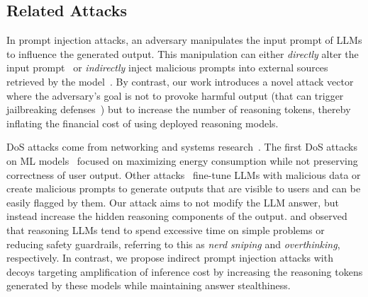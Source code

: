 \subsection{Related Attacks}

 In prompt injection attacks, an adversary manipulates the input prompt of LLMs to influence the generated output. This manipulation can either \emph{directly} alter the input prompt~\citep{perez2022ignore, apruzzese2023real} or \emph{indirectly} inject malicious prompts into external sources retrieved by the model~\citep{greshake2023not}. By contrast, our work introduces a novel attack vector where the adversary's goal is not to provoke harmful output (that can trigger jailbreaking defenses~\cite{anthropic2025, zaremba2025trading}) but to increase the number of reasoning tokens, thereby inflating the financial cost of using deployed reasoning models.



 DoS attacks come from networking and systems research~\citep{bellardo2003802, heftrig2024harder,martin2004denial}. The first DoS attacks on ML models~\citep{shumailov2021sponge} focused on maximizing energy consumption while not preserving correctness of user output. Other attacks~\citep{gao2024denial,chen2022nicgslowdown, gao2024inducing, geiping2024coercing} fine-tune LLMs with malicious data or create malicious prompts to generate outputs that are visible to users and can be easily flagged by them. Our attack aims to not modify the LLM answer,  but instead increase the hidden reasoning components of the output. \citet{zaremba2025trading} and \citet{chen2024not,wang2025underthinking} observed that reasoning LLMs tend to spend excessive time on simple problems or reducing safety guardrails, referring to this as \textit{nerd sniping} and \textit{overthinking}, respectively. In contrast, we propose indirect prompt injection attacks with decoys targeting amplification of inference cost by increasing the reasoning tokens generated by these models while maintaining answer stealthiness.